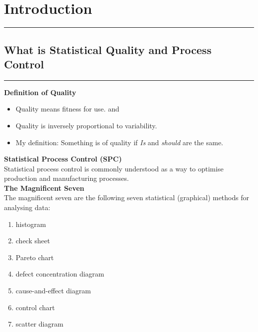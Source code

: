 \section{Introduction}
\noindent\rule[\linienAbstand]{\linewidth}{\linienDickeDick}

\subsection{What is Statistical Quality and Process Control}
\noindent\rule[\linienAbstand]{\linewidth}{\linienDicke}
\textbf{Definition of Quality}\\
\begin{itemize}
  \item Quality means fitness for use. and
  \item Quality is inversely proportional to variability.
  \item My definition: Something is of quality if \emph{Is} and \emph{should} are the same.
\end{itemize}

\textbf{Statistical Process Control (SPC)}\\
Statistical process control is commonly understood as a way to optimise production and manufacturing processes.\\

\textbf{The Magnificent Seven}\\
The magnificent seven are the following seven statistical (graphical) methods for analysing data:
\begin{enumerate}
  \item histogram
  \item check sheet
  \item Pareto chart
  \item defect concentration diagram
  \item cause-and-effect diagram
  \item control chart
  \item scatter diagram
\end{enumerate}

